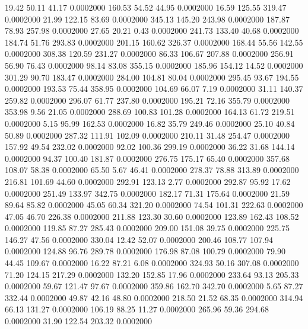   19.42   50.11   41.17   0.0002000
 160.53   54.52   44.95   0.0002000
  16.59  125.55  319.47   0.0002000
  21.99  122.15   83.69   0.0002000
 345.13  145.20  243.98   0.0002000
 187.87   78.93  257.98   0.0002000
  27.65   20.21    0.43   0.0002000
 241.73  133.40   40.68   0.0002000
 184.74   51.76  293.83   0.0002000
 201.15  160.62  326.37   0.0002000
 168.44   55.56  142.55   0.0002000
 308.38  120.59  231.27   0.0002000
  86.33  106.67  207.88   0.0002000
 256.91   56.90   76.43   0.0002000
  98.14   83.08  355.15   0.0002000
 185.96  154.12   14.52   0.0002000
 301.29   90.70  183.47   0.0002000
 284.00  104.81   80.04   0.0002000
 295.45   93.67  194.55   0.0002000
 193.53   75.44  358.95   0.0002000
 104.69   66.07    7.19   0.0002000
  31.11  140.37  259.82   0.0002000
 296.07   61.77  237.80   0.0002000
 195.21   72.16  355.79   0.0002000
 353.98    9.56   21.05   0.0002000
 288.69  100.83  101.28   0.0002000
 164.13   61.72  219.51   0.0002000
   5.15   95.99  162.53   0.0002000
  16.82   35.79  249.46   0.0002000
  25.10   40.84   50.89   0.0002000
 287.32  111.91  102.09   0.0002000
 210.11   31.48  254.47   0.0002000
 157.92   49.54  232.02   0.0002000
  92.02  100.36  299.19   0.0002000
  36.22   31.68  144.14   0.0002000
  94.37  100.40  181.87   0.0002000
 276.75  175.17   65.40   0.0002000
 357.68  108.07   58.38   0.0002000
  65.50    5.67   46.41   0.0002000
 278.37   78.88  313.89   0.0002000
 216.81  101.69   44.60   0.0002000
 292.91  123.13    2.77   0.0002000
 292.87   95.92   17.62   0.0002000
 251.49  133.97  342.75   0.0002000
 182.17   71.31  175.64   0.0002000
  21.59   89.64   85.82   0.0002000
  45.05   60.34  321.20   0.0002000
  74.54  101.31  222.63   0.0002000
  47.05   46.70  226.38   0.0002000
 211.88  123.30   30.60   0.0002000
 123.89  162.43  108.52   0.0002000
 119.85   87.27  285.43   0.0002000
 209.00  151.08   39.75   0.0002000
 225.75  146.27   47.56   0.0002000
 330.04   12.42   52.07   0.0002000
 200.46  108.77  107.94   0.0002000
 124.88   96.76  289.78   0.0002000
 176.98   87.08  100.79   0.0002000
  79.90   44.45  109.67   0.0002000
  16.22   87.21    6.08   0.0002000
 324.93   50.16  307.08   0.0002000
  71.20  124.15  217.29   0.0002000
 132.20  152.85   17.96   0.0002000
 233.64   93.13  205.33   0.0002000
  59.67  121.47   97.67   0.0002000
 359.86  162.70  342.70   0.0002000
   5.65   87.27  332.44   0.0002000
  49.87   42.16   48.80   0.0002000
 218.50   21.52   68.35   0.0002000
 314.94   66.13  131.27   0.0002000
 106.19   88.25   11.27   0.0002000
 265.96   59.36  294.68   0.0002000
  31.90  122.54  203.32   0.0002000
